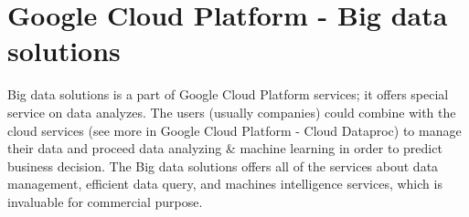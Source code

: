 \section{Google Cloud Platform - Big data solutions}

Big data solutions is a part of Google Cloud Platform services; it offers special service on data analyzes\cite{GoogleCP_BDS}. The users (usually companies) could combine with the cloud services (see more in Google Cloud Platform - Cloud Dataproc) to manage their data and proceed data analyzing & machine learning in order to predict business decision. The Big data solutions offers all of the services about data management, efficient data query, and machines intelligence services, which is invaluable for commercial purpose\cite{GoogleCP_BDS}.
